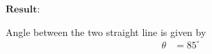 \documentclass[journal,12pt,twocolumn]{IEEEtran}
\begin{document}
$\boldsymbol{ Result : }$

Angle between the two straight line is given by
\begin{align}
    \theta&=85^{\circ}
\end{align}


%
%
%
%
\end{document}
